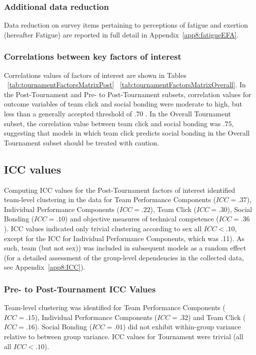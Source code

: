 \begin{CJK}{UTF8}{gbsn}
\subsubsection{Additional data reduction}
Data reduction on survey items pertaining to perceptions of fatigue and exertion (hereafter Fatigue) are reported in full detail in Appendix~\ref{app8:fatigueEFA}.


\subsubsection{Correlations between key factors of interest}
Correlations values of factors of interest are shown in Tables ~\ref{tab:tournamentFactorsMatrixPost} \nobreakdash ~\ref{tab:tournamentFactorsMatrixOverall}.  In the Post-Tournament and Pre- to Post-Tournament subsets, correlation values for outcome variables of team click and social bonding were moderate to high, but less than a generally accepted threshold of .70 \citep{Field2012}.  In the Overall Tournament subset, the correlation value between team click and social bonding was $.75$, suggesting that models in which team click predicts social bonding in the Overall Tournament subset should be treated with caution.

%
%
%




\subsection{ICC values}

Computing ICC values for the Post-Tournament factors of interest identified team-level clustering in the data for Team Performance Components ($ICC = .37$), Individual Performance Components ($ICC = .22$), Team Click ($ICC = .30$), Social Bonding ($ICC = .10$) and objective measures of technical competence ($ICC = .36$).  ICC values indicated only trivial clustering according to sex all $ICC < .10$, except for the ICC for Individual Performance Components, which was .11).  As such, team (but not sex)) was included in subsequent models as a random effect (for a detailed assessment of the group-level dependencies in the collected data, see Appendix~\ref{app8:ICC}).


\subsubsection{Pre- to Post-Tournament ICC Values}
Team-level clustering was identified for
Team Performance Components ($ICC = .15$), Individual Performance Components ($ICC = .32$) and Team Click ($ICC = .16$).  Social Bonding ($ICC = .01$) did not exhibit within-group variance relative to between group variance. ICC values for Tournament were trivial (all all $ICC < .10$).


\end{CJK}
